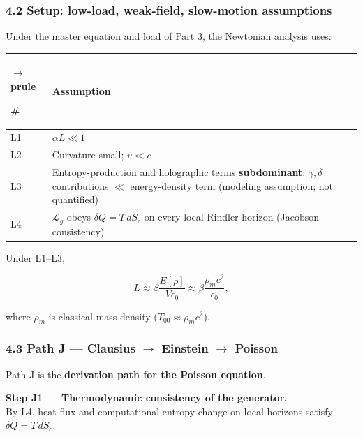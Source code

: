 \documentclass[
  11pt,
]{article}
\newcounter{none} %
\begin{document}
\subsubsection{4.2 Setup: low-load, weak-field, slow-motion assumptions}\label{setup-low-load-weak-field-slow-motion-assumptions}

Under the master equation and load of Part 3, the Newtonian analysis uses:

{\def\LTcaptype{none} %
\begin{longtable}[]{@{}
  >{\raggedright\arraybackslash}p{}
  >{\raggedright\arraybackslash}p{}@{}}
$\rightarrow$prule\noalign{}
\begin{minipage}[b]{\linewidth}\raggedright
\#
\end{minipage} & \begin{minipage}[b]{\linewidth}\raggedright
Assumption
\end{minipage} \\
\midrule\noalign{}
\endhead
\bottomrule\noalign{}
\endlastfoot
L1 & \(\alpha L\ll 1\) \\
L2 & Curvature small; \(v\ll c\) \\
L3 & Entropy-production and holographic terms \textbf{subdominant}: \(\gamma,\delta\) contributions \(\ll\) energy-density term (modeling assumption; not quantified) \\
L4 & \(\mathcal{L}_g\) obeys \(\delta Q=T\,dS_c\) on every local Rindler horizon (Jacobson consistency) \\
\end{longtable}
}

Under L1--L3,

\[
L
\approx
\beta\frac{E[\rho]}{V\epsilon_0}
\approx
\beta\frac{\rho_m c^2}{\epsilon_0},
\]

where \(\rho_m\) is classical mass density (\(T_{00}\approx\rho_m c^2\)).

\subsubsection{\texorpdfstring{4.3 Path J --- Clausius $\rightarrow$ Einstein $\rightarrow$ Poisson}{4.3 Path J --- Clausius Einstein Poisson}}\label{path-j-clausius-einstein-poisson}

Path J is the \textbf{derivation path for the Poisson equation}.

\textbf{Step J1 --- Thermodynamic consistency of the generator.}\\
By L4, heat flux and computational-entropy change on local horizons satisfy \(\delta Q=T\,dS_c\).
\end{document}
